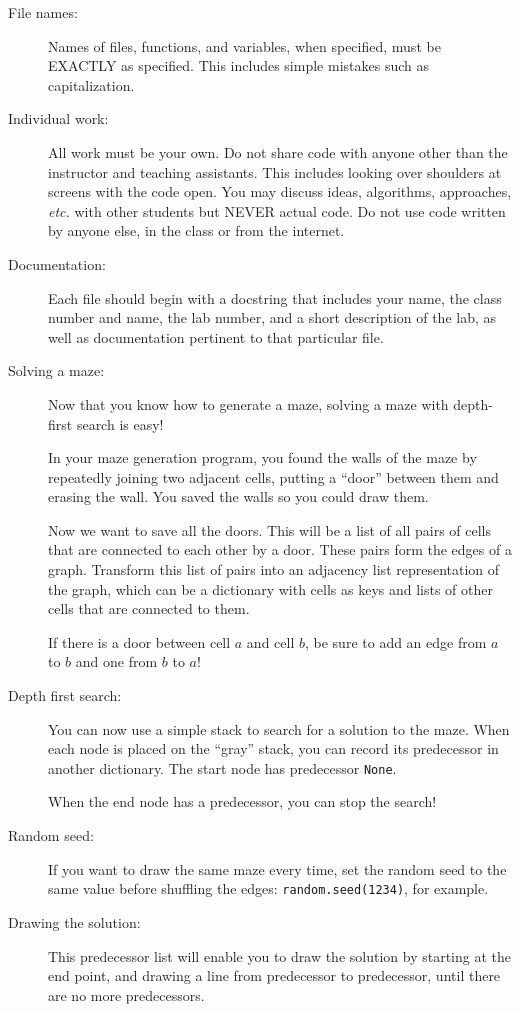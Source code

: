 \documentclass{article}
\begin{document}
\begin{description}

\item[File names:]  Names of files, functions, and variables, 
when specified,
must be EXACTLY as specified.  This includes simple mistakes such
as capitalization.

\item[Individual work:]  All work must be your own.  Do not share
code with anyone other than the instructor and teaching assistants.
This includes looking over shoulders at screens with the code open.
You may discuss ideas, algorithms, approaches, {\em etc.} with
other students but NEVER actual code.  Do not use code
written by anyone else, in the class or from the internet.

\item[Documentation:] Each file should begin with a docstring
that includes your name, the class number and name, the lab
number, and  
a short description of the lab, as well as documentation pertinent
to that particular file.

  
\item[Solving a maze:]  Now that you know how to generate a maze,
solving a maze with depth-first search is easy!

In your maze generation program, you found the walls of the maze
by repeatedly joining two adjacent cells, putting a ``door'' between
them and erasing the wall.  You saved the walls so you could draw 
them.

Now we want to save all the doors.  This will be a list of all pairs
of cells that are connected to each other by a door.  These
pairs form the edges of a graph.  Transform
this list of pairs into an adjacency list representation of the graph,
which can be a dictionary with cells as keys and lists of other
cells that are connected to them.

If there is a door between cell $a$ and cell $b$, be sure to 
add an edge from $a$ to $b$ and one from $b$ to $a$!

\item[Depth first search:]  You can now use a simple stack
to search for a solution to the maze.  When each node is
placed on the ``gray'' stack, you can record its predecessor
in another dictionary.  The start node has predecessor {\tt None}.

When the end node has a predecessor, you can stop
the search!

\item[Random seed:] If you want to draw the same maze
every time, set the random seed to the same value before
shuffling the edges:  {\tt random.seed(1234)}, for example. 
\item[Drawing the solution:]
This predecessor list will enable
you to draw the solution by starting at the end point, and drawing
a line from predecessor to predecessor, until there are no more
predecessors.


\end{description}
\end{document}
